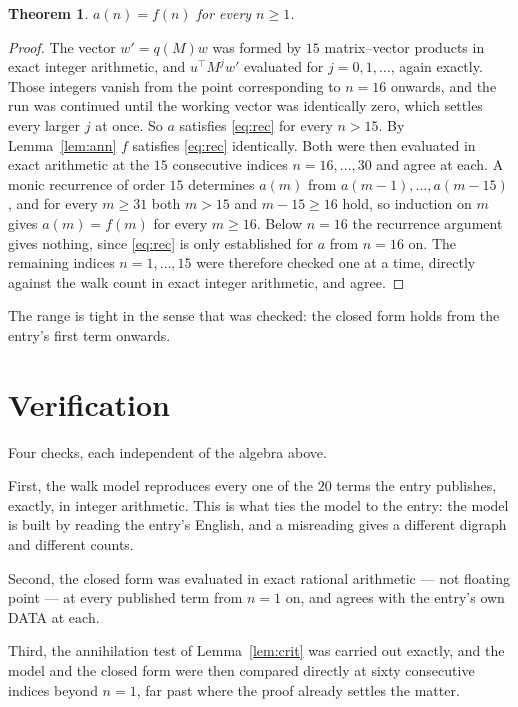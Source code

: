 \documentclass[11pt,a4paper]{article}
\theoremstyle{plain}
\newtheorem{theorem}{Theorem}
\theoremstyle{definition}
\begin{document}
\begin{theorem}
$a(n)=f(n)$ for every $n\ge1$.
\end{theorem}

\begin{proof}
The vector $w'=q(M)w$ was formed by $15$ matrix--vector products in exact integer
arithmetic, and $u^{\!\top}M^{j}w'$ evaluated for $j=0,1,\dots$, again exactly. Those integers
vanish from the point corresponding to $n=16$ onwards, and the run was continued until the
working vector was identically zero, which settles every larger $j$ at once. So $a$ satisfies
\eqref{eq:rec} for every $n>15$. By Lemma~\ref{lem:ann} $f$ satisfies \eqref{eq:rec}
identically. Both were then evaluated in exact arithmetic at the $15$ consecutive indices
$n=16,\dots,30$ and agree at each. A monic recurrence of order $15$
determines $a(m)$ from $a(m-1),\dots,a(m-15)$, and for every $m\ge31$ both
$m>15$ and $m-15\ge16$ hold, so induction on $m$ gives $a(m)=f(m)$ for every
$m\ge16$.
Below $n=16$ the recurrence argument gives nothing, since \eqref{eq:rec} is only
established for $a$ from $n=16$ on. The remaining indices $n=1,\dots,15$ were
therefore checked one at a time, directly against the walk count in exact integer arithmetic,
and agree.
\end{proof}

The range is tight in the sense that was checked: the closed form holds from the entry's first term onwards.

\section{Verification}

Four checks, each independent of the algebra above.

First, the walk model reproduces every one of the $20$ terms the entry publishes,
exactly, in integer arithmetic. This is what ties the model to the entry: the model is built
by reading the entry's English, and a misreading gives a different digraph and different
counts.

Second, the closed form was evaluated in exact rational arithmetic --- not floating point ---
at every published term from $n=1$ on, and agrees with the entry's own DATA at each.

Third, the annihilation test of Lemma~\ref{lem:crit} was carried out exactly, and the model
and the closed form were then compared directly at sixty consecutive indices beyond
$n=1$, far past where the proof already settles the matter.
\end{document}

